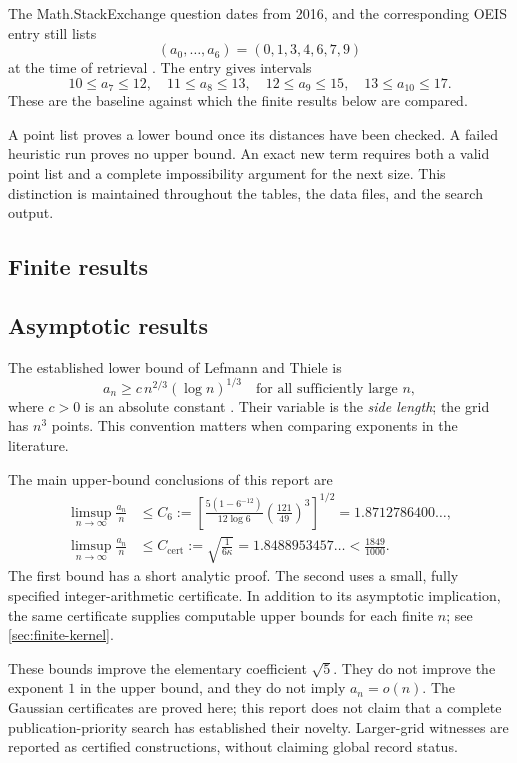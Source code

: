 \documentclass[11pt,letterpaper]{article}
\theoremstyle{definition}
\begin{document}
The Math.StackExchange question dates from 2016, and the corresponding
OEIS entry still lists
\[
 (a_0,\ldots,a_6)=(0,1,3,4,6,7,9)
\]
at the time of retrieval \cite{mse,oeis}. The entry gives intervals
\[
 10\le a_7\le12,\quad 11\le a_8\le13,\quad
 12\le a_9\le15,\quad 13\le a_{10}\le17.
\]
These are the baseline against which the finite results below are compared.

A point list proves a lower bound once its distances have been checked.
A failed heuristic run proves no upper bound. An exact new term requires
both a valid point list and a complete impossibility argument for the next
size. This distinction is maintained throughout the tables, the data files,
and the search output.

\subsection{Finite results}


\subsection{Asymptotic results}
\label{sec:main-asymptotic}
The established lower bound of Lefmann and Thiele is
\begin{equation}
 a_n\ge c\,n^{2/3}(\log n)^{1/3}
 \quad\text{for all sufficiently large }n,
 \label{eq:LT}
\end{equation}
where \(c>0\) is an absolute constant \cite{lt,ltreport}.
Their variable is the \emph{side length}; the grid has \(n^3\) points.
This convention matters when comparing exponents in the literature.

The main upper-bound conclusions of this report are
\begin{align}
 \limsup_{n\to\infty}\frac{a_n}{n}
 &\le
 C_6:=
 \left[
 \frac{5(1-6^{-12})}{12\log6}
 \left(\frac{121}{49}\right)^3
 \right]^{1/2}
 =1.8712786400\ldots ,
 \label{eq:main-analytic}\\
 \limsup_{n\to\infty}\frac{a_n}{n}
 &\le
 C_{\mathrm{cert}}:=
 \sqrt{\frac1{6\kappa}}
 =1.8488953457\ldots<\frac{1849}{1000}.
 \label{eq:main-certified}
\end{align}
The first bound has a short analytic proof. The second uses a small,
fully specified integer-arithmetic certificate. In addition to its
asymptotic implication, the same certificate supplies computable upper
bounds for each finite \(n\); see \cref{sec:finite-kernel}.

These bounds improve the elementary coefficient \(\sqrt5\). They do not
improve the exponent \(1\) in the upper bound, and they do not imply
\(a_n=o(n)\). The Gaussian certificates are proved here; this report
does not claim that a complete publication-priority search has established
their novelty. Larger-grid witnesses are reported as certified
constructions, without claiming global record status.
\end{document}
